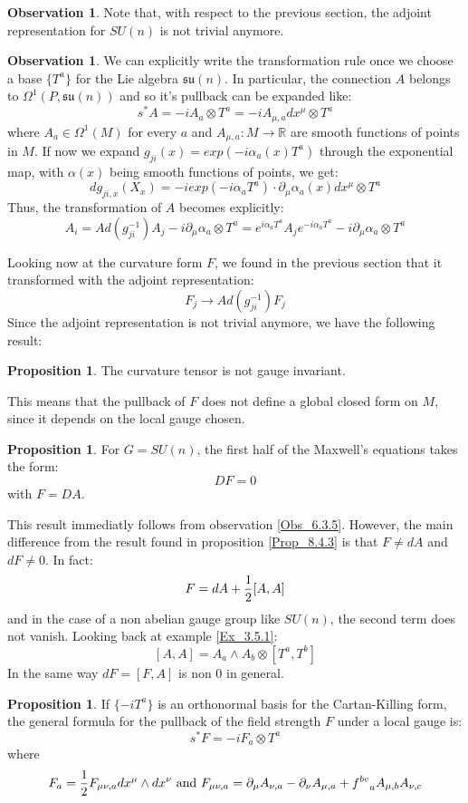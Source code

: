 \documentclass[12pt,a4paper]{report}
\theoremstyle{definition}
\theoremstyle{Theorem}
\newtheorem{Prop}[Def]{Proposition}
\theoremstyle{definition}
\theoremstyle{definition}
\newtheorem{Obs}[Def]{Observation}
\begin{document}
	\begin{Obs}
		Note that, with respect to the previous section, the adjoint representation for $SU(n)$ is not trivial anymore.
	\end{Obs}
	\begin{Obs}
		We can explicitly write the transformation rule once we choose a base $\{T^a\}$ for the Lie algebra $\mathfrak{su}(n)$. In particular, the connection $A$ belongs to $\Omega^1(P,\mathfrak{su}(n))$ and so it's pullback can be expanded like:
		$$s^*A=-iA_a\otimes T^a=-iA_{\mu,a}dx^\mu\otimes T^a$$
		where $A_a\in\Omega^1(M)$ for every $a$ and $A_{\mu,a}:M\rightarrow\mathbb{R}$ are smooth functions of points in $M$. 
		If now we expand $g_{ji}(x)=exp(-i\alpha_a(x)T^a)$ through the exponential map, with $\alpha(x)$ being smooth functions of points, we get:
		$$dg_{ji,x}(X_x)=-iexp(-i\alpha_aT^a)\cdot \partial_\mu \alpha_{a}(x)dx^\mu\otimes T^a$$
		Thus, the transformation of $A$ becomes explicitly:
		$$A_i=Ad(g_{ji}^{-1})A_j-i\partial_\mu\alpha_a\otimes T^a=e^{i\alpha_aT^a}A_je^{-i\alpha_aT^a}-i\partial_\mu\alpha_a\otimes T^a$$
	\end{Obs}
	Looking now at the curvature form $F$, we found in the previous section that it transformed with the adjoint representation:
	$$F_j\rightarrow Ad(g_{ji}^{-1})F_j$$ 
	Since the adjoint representation is not trivial anymore, we have the following result:
	\begin{Prop}
		The curvature tensor is not gauge invariant.
	\end{Prop}
	This means that the pullback of $F$ does not define a global closed form on $M$, since it depends on the local gauge chosen.
	\begin{Prop}
		For $G=SU(n)$, the first half of the Maxwell's equations takes the form:
		$$DF=0$$
		with $F=DA$.
	\end{Prop}
	This result immediatly follows from observation \ref{Obs_6.3.5}. However, the main difference from the result found in proposition \ref{Prop_8.4.3} is that $F\neq dA$ and $dF\neq 0$. In fact:
	$$F=dA+{1\over 2}[A,A]$$
	and in the case of a non abelian gauge group like $SU(n)$, the second term does not vanish. Looking back at example \ref{Ex_3.5.1}:
	$$[A,A]=A_a\wedge A_b \otimes [T^a,T^b]$$ 
	In the same way $dF=[F,A]$ is non 0 in general.
	\begin{Prop}
		If $\{-iT^a\}$ is an orthonormal basis for the Cartan-Killing form, the general formula for the pullback of the field strength $F$ under a local gauge is:
		$$s^*F=-iF_{a}\otimes T^a$$
		where 
		$$F_a={1\over 2}F_{\mu\nu,a}dx^\mu\wedge dx^\nu \hbox{ and }F_{\mu\nu,a}=\partial_\mu A_{\nu,a}-\partial_\nu A_{\mu,a}+f^{bc}_{\hspace{9pt}a}A_{\mu,b}A_{\nu,c}$$
	\end{Prop}
\end{document}

